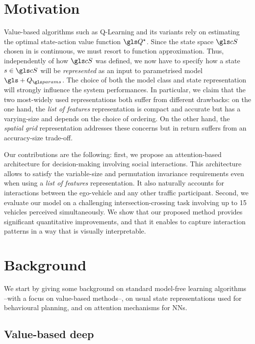\section{Motivation}

Value-based  algorithms such as Q-Learning \citep{Watkins1992} and its variants rely on estimating the optimal state-action value function $\Q^\star$. Since the state space $\cS$ chosen in  is continuous, we must resort to function approximation. Thus, independently of how $\cS$ was defined, we now have to specify how a state $s\in\cS$ will be \textit{represented} as an input to parametrised model $\gls+{Q}_\params$. The choice of both the model class and state representation will strongly influence the system performances. In particular, we claim that the two most-widely used representations both suffer from different drawbacks: on the one hand, the \emph{list of features} representation is compact and accurate but has a varying-size and depends on the choice of ordering. On the other hand, the \emph{spatial grid} representation addresses these concerns but in return suffers from an accuracy-size trade-off.

Our contributions are the following: first, we propose an attention-based architecture for decision-making involving social interactions. This architecture allows to satisfy the variable-size and permutation invariance requirements even when using a \emph{list of features} representation. It also naturally accounts for interactions between the ego-vehicle and any other traffic participant.
Second, we evaluate our model on a challenging intersection-crossing task involving up to 15 vehicles perceived simultaneously. We show that our proposed method provides significant quantitative improvements, and that it enables to capture interaction patterns in a way that is visually interpretable.

\section{Background}

\label{sec:background}

We start by giving some background on standard \gls{model-free} learning algorithms --with a focus on value-based methods--, on usual state representations used for behavioural planning, and on attention mechanisms for \glspl{NN}.

\subsection{Value-based deep }

